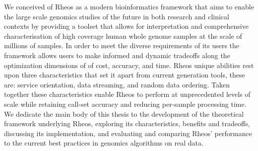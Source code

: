We conceived of Rheos as a modern bioinformatics framework that aims to enable the large scale genomics studies of the future\autocite{turnbull2018100,kaiser2016biden,margolis2014national} in both research and clinical contexts by providing a toolset that allows for interpretation and comprehensive characterisation of high coverage human whole genome samples at the scale of millions of samples. In order to meet the diverse requirements of its users the framework allows users to make informed and dynamic tradeoffs along the optimization dimensions of of cost, accuracy, and time. Rheos unique abilities rest upon three characteristics that set it apart from current generation tools, these are: service orientation, data streaming, and random data ordering. Taken together these characteristics enable Rheos to perform at unprecedented levels of scale while retaining call-set accuracy and reducing per-sample processing time. We dedicate the main body of this thesis to the development of the theoretical framework underlying Rheos, exploring its characteristics, benefits and tradeoffs, discussing its implementation, and evaluating and comparing Rheos' performance to the current best practices in genomics algorithms on real data.  

